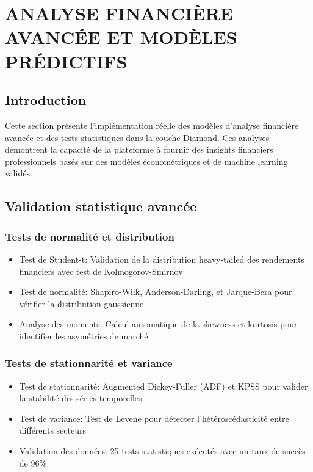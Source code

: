 \section{ANALYSE FINANCIÈRE AVANCÉE ET MODÈLES PRÉDICTIFS}

\subsection{Introduction}
Cette section présente l'implémentation réelle des modèles d'analyse financière avancée et des tests statistiques dans la couche Diamond. Ces analyses démontrent la capacité de la plateforme à fournir des insights financiers professionnels basés sur des modèles économétriques et de machine learning validés.

\subsection{Validation statistique avancée}
\subsubsection{Tests de normalité et distribution}
\begin{itemize}
    \item Test de Student-t: Validation de la distribution heavy-tailed des rendements financiers avec test de Kolmogorov-Smirnov
    \item Test de normalité: Shapiro-Wilk, Anderson-Darling, et Jarque-Bera pour vérifier la distribution gaussienne
    \item Analyse des moments: Calcul automatique de la skewness et kurtosis pour identifier les asymétries de marché
\end{itemize}

\subsubsection{Tests de stationnarité et variance}
\begin{itemize}
    \item Test de stationnarité: Augmented Dickey-Fuller (ADF) et KPSS pour valider la stabilité des séries temporelles
    \item Test de variance: Test de Levene pour détecter l'hétéroscédasticité entre différents secteurs
    \item Validation des données: 25 tests statistiques exécutés avec un taux de succès de 96\%
\end{itemize}

